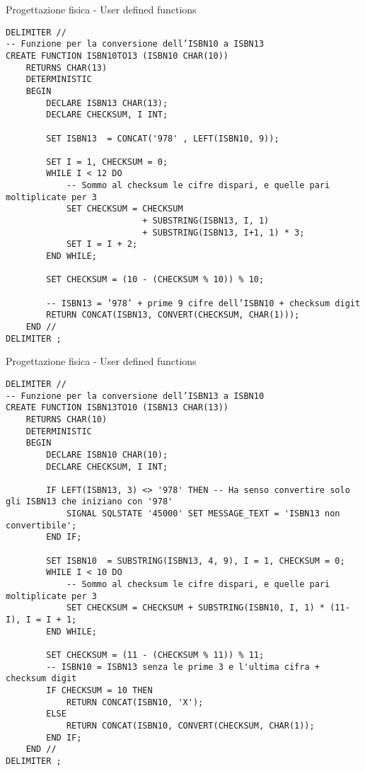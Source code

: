 \begin{frame}[fragile]{Progettazione fisica - User defined functions}
    \begin{verbatim}
DELIMITER //
-- Funzione per la conversione dell’ISBN10 a ISBN13
CREATE FUNCTION ISBN10TO13 (ISBN10 CHAR(10))
    RETURNS CHAR(13)
    DETERMINISTIC
    BEGIN
        DECLARE ISBN13 CHAR(13);
        DECLARE CHECKSUM, I INT;

        SET ISBN13  = CONCAT('978' , LEFT(ISBN10, 9));

        SET I = 1, CHECKSUM = 0;
        WHILE I < 12 DO
            -- Sommo al checksum le cifre dispari, e quelle pari moltiplicate per 3
            SET CHECKSUM = CHECKSUM
                           + SUBSTRING(ISBN13, I, 1)
                           + SUBSTRING(ISBN13, I+1, 1) * 3;
            SET I = I + 2;
        END WHILE;

        SET CHECKSUM = (10 - (CHECKSUM % 10)) % 10;

        -- ISBN13 = ’978’ + prime 9 cifre dell’ISBN10 + checksum digit
        RETURN CONCAT(ISBN13, CONVERT(CHECKSUM, CHAR(1)));
    END //
DELIMITER ;
    \end{verbatim}
\end{frame}

\begin{frame}[fragile]{Progettazione fisica - User defined functions}
    \begin{verbatim}
DELIMITER //
-- Funzione per la conversione dell’ISBN13 a ISBN10
CREATE FUNCTION ISBN13TO10 (ISBN13 CHAR(13))
    RETURNS CHAR(10)
    DETERMINISTIC
    BEGIN
        DECLARE ISBN10 CHAR(10);
        DECLARE CHECKSUM, I INT;

        IF LEFT(ISBN13, 3) <> '978' THEN -- Ha senso convertire solo gli ISBN13 che iniziano con '978'
            SIGNAL SQLSTATE '45000' SET MESSAGE_TEXT = 'ISBN13 non convertibile';
        END IF;

        SET ISBN10  = SUBSTRING(ISBN13, 4, 9), I = 1, CHECKSUM = 0;
        WHILE I < 10 DO
            -- Sommo al checksum le cifre dispari, e quelle pari moltiplicate per 3
            SET CHECKSUM = CHECKSUM + SUBSTRING(ISBN10, I, 1) * (11-I), I = I + 1;
        END WHILE;

        SET CHECKSUM = (11 - (CHECKSUM % 11)) % 11;
        -- ISBN10 = ISBN13 senza le prime 3 e l'ultima cifra + checksum digit
        IF CHECKSUM = 10 THEN
            RETURN CONCAT(ISBN10, 'X');
        ELSE
            RETURN CONCAT(ISBN10, CONVERT(CHECKSUM, CHAR(1));
        END IF;
    END //
DELIMITER ;
    \end{verbatim}
\end{frame}